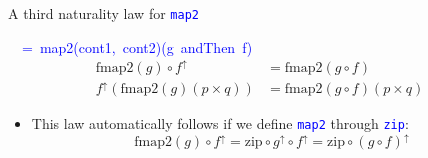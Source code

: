 \documentclass[english]{beamer}
\newenvironment{lyxcode}
   {\par\begin{list}{}{
     \setlength{\rightmargin}{\leftmargin}
     \setlength{\listparindent}{0pt}%
     \raggedright
     \setlength{\itemsep}{0pt}
     \setlength{\parsep}{0pt}
     \normalfont\ttfamily}%
    \def\{{\char`\{}
    \def\}{\char`\}}
    \def\textasciitilde{\char`\~}
    \item[]}
   {\end{list}}
\begin{document}
\begin{frame}{A third naturality law for \texttt{\textcolor{blue}{\footnotesize{}map2}} }
\begin{lyxcode}
\textcolor{blue}{\footnotesize{}~~=~map2(cont1,~cont2)(g~andThen~f)}{\footnotesize{}
\begin{align*}
\text{fmap}2\left(g\right)\circ f^{\uparrow} & =\text{fmap2}\left(g\circ f\right)\\
f^{\uparrow}\left(\text{fmap}2\left(g\right)\left(p\times q\right)\right) & =\text{fmap2}\left(g\circ f\right)\left(p\times q\right)
\end{align*}
}{\footnotesize \par}
\end{lyxcode}
\begin{itemize}
\item This law automatically follows if we define \texttt{\textcolor{blue}{\footnotesize{}map2}}
through \texttt{\textcolor{blue}{\footnotesize{}zip}}:{\footnotesize{}
\[
\text{fmap}2\left(g\right)\circ f^{\uparrow}=\text{zip}\circ g^{\uparrow}\circ f^{\uparrow}=\text{zip}\circ\left(g\circ f\right)^{\uparrow}
\]
}{\footnotesize \par}
\end{itemize}
\end{frame}
\end{document}
